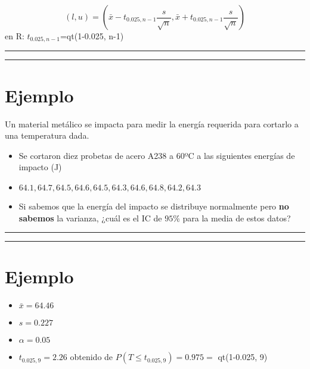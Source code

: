 \documentclass[
]{book}
\providecommand{\tightlist}{%
  \setlength{\itemsep}{0pt}\setlength{\parskip}{0pt}}
\begin{document}
\[(l,u)=(\bar{x}-t_{0.025, n-1} \frac{s}{\sqrt{n}}, \bar{x}+t_{0.025, n-1} \frac{s}{\sqrt{n}})\]
en R: \(t_{0.025, n-1}\)=qt(1-0.025, n-1)

\begin{center}\rule{0.5\linewidth}{0.5pt}\end{center}

\begin{center}\rule{0.5\linewidth}{0.5pt}\end{center}

\hypertarget{ejemplo-16}{%
\section{Ejemplo}\label{ejemplo-16}}

Un material metálico se impacta para medir la energía requerida para cortarlo a una temperatura dada.

\begin{itemize}
\item
  Se cortaron diez probetas de acero A238 a 60ºC a las siguientes energías de impacto (J)
\item
  \(64.1, 64.7, 64.5, 64.6, 64.5, 64.3, 64.6, 64.8, 64.2, 64.3\)
\item
  Si sabemos que la energía del impacto se distribuye normalmente pero \textbf{no sabemos} la varianza, ¿cuál es el IC de \(95\%\) para la media de estos datos?
\end{itemize}

\begin{center}\rule{0.5\linewidth}{0.5pt}\end{center}

\begin{center}\rule{0.5\linewidth}{0.5pt}\end{center}

\hypertarget{ejemplo-17}{%
\section{Ejemplo}\label{ejemplo-17}}

\begin{itemize}
\tightlist
\item
  \(\bar{x}=64.46\)
\item
  \(s=0.227\)
\item
  \(\alpha=0.05\)
\item
  \(t_{0.025,9}=2.26\) obtenido de \(P(T \leq t_{0.025,9})=0.975=\) qt(1-0.025, 9)
\end{itemize}
\end{document}
